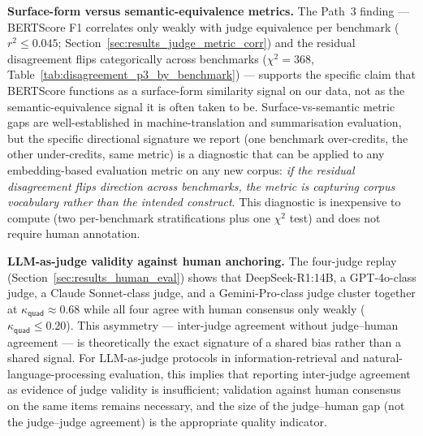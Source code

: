 \textbf{Surface-form versus semantic-equivalence metrics.} The Path~3 finding --- BERTScore F1 correlates only weakly with judge equivalence per benchmark ($r^2 \leq 0.045$; Section~\ref{sec:results_judge_metric_corr}) and the residual disagreement flips categorically across benchmarks ($\chi^2 = 368$, Table~\ref{tab:disagreement_p3_by_benchmark}) --- supports the specific claim that BERTScore functions as a surface-form similarity signal on our data, not as the semantic-equivalence signal it is often taken to be. Surface-vs-semantic metric gaps are well-established in machine-translation and summarisation evaluation, but the specific directional signature we report (one benchmark over-credits, the other under-credits, same metric) is a diagnostic that can be applied to any embedding-based evaluation metric on any new corpus: \emph{if the residual disagreement flips direction across benchmarks, the metric is capturing corpus vocabulary rather than the intended construct}. This diagnostic is inexpensive to compute (two per-benchmark stratifications plus one $\chi^2$ test) and does not require human annotation.

\textbf{LLM-as-judge validity against human anchoring.} The four-judge replay (Section~\ref{sec:results_human_eval}) shows that DeepSeek-R1:14B, a GPT-4o-class judge, a Claude Sonnet-class judge, and a Gemini-Pro-class judge cluster together at $\kappa_{\textsf{quad}} \approx 0.68$ while all four agree with human consensus only weakly ($\kappa_{\textsf{quad}} \leq 0.20$). This asymmetry --- inter-judge agreement without judge--human agreement --- is theoretically the exact signature of a shared bias rather than a shared signal. For LLM-as-judge protocols in information-retrieval and natural-language-processing evaluation, this implies that reporting inter-judge agreement as evidence of judge validity is insufficient; validation against human consensus on the same items remains necessary, and the size of the judge--human gap (not the judge--judge agreement) is the appropriate quality indicator.
